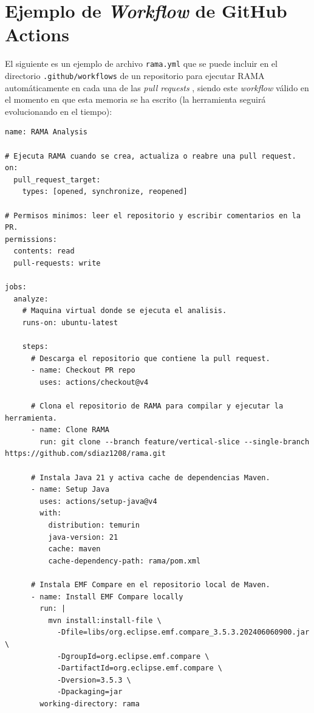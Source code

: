 \documentclass[11pt]{article}
\begin{document}
\newpage

\appendix

\section{Ejemplo de \textit{Workflow} de GitHub Actions}
\label{app:workflow-github-actions}

El siguiente es un ejemplo de archivo \texttt{rama.yml} que se puede incluir en el directorio \texttt{.github/workflows} de un repositorio para ejecutar RAMA automáticamente en cada una de las \textit{pull requests} \cite{github-actions}, siendo este \textit{workflow} válido en el momento en que esta memoria se ha escrito (la herramienta seguirá evolucionando en el tiempo):

\begin{lstlisting}[caption={Ejemplo de \textit{Workflow} de GitHub Actions.},label={lst:workflow-github-actions}]
name: RAMA Analysis

# Ejecuta RAMA cuando se crea, actualiza o reabre una pull request.
on:
  pull_request_target:
    types: [opened, synchronize, reopened]

# Permisos minimos: leer el repositorio y escribir comentarios en la PR.
permissions:
  contents: read
  pull-requests: write

jobs:
  analyze:
    # Maquina virtual donde se ejecuta el analisis.
    runs-on: ubuntu-latest

    steps:
      # Descarga el repositorio que contiene la pull request.
      - name: Checkout PR repo
        uses: actions/checkout@v4

      # Clona el repositorio de RAMA para compilar y ejecutar la herramienta.
      - name: Clone RAMA
        run: git clone --branch feature/vertical-slice --single-branch https://github.com/sdiaz1208/rama.git

      # Instala Java 21 y activa cache de dependencias Maven.
      - name: Setup Java
        uses: actions/setup-java@v4
        with:
          distribution: temurin
          java-version: 21
          cache: maven
          cache-dependency-path: rama/pom.xml

      # Instala EMF Compare en el repositorio local de Maven.
      - name: Install EMF Compare locally
        run: |
          mvn install:install-file \
            -Dfile=libs/org.eclipse.emf.compare_3.5.3.202406060900.jar \
            -DgroupId=org.eclipse.emf.compare \
            -DartifactId=org.eclipse.emf.compare \
            -Dversion=3.5.3 \
            -Dpackaging=jar
        working-directory: rama


\end{lstlisting}
\end{document}
